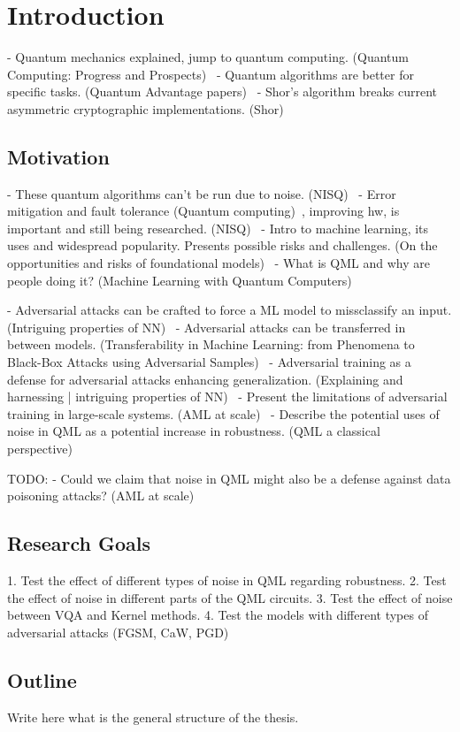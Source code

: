 \chapter{Introduction}\label{chapter:introduction}

- Quantum mechanics explained, jump to quantum computing. (Quantum Computing: Progress and Prospects)~\cite{national_academies_of_sciences_engineering_and_medicine_quantum_2019}
- Quantum algorithms are better for specific tasks. (Quantum Advantage papers)~\cite{shor_polynomial-time_1997, van_dam_quantum_2006, hallgren_polynomial-time_2007}
- Shor's algorithm breaks current asymmetric cryptographic implementations. (Shor)~\cite{shor_polynomial-time_1997}

\section{Motivation}
- These quantum algorithms can't be run due to noise. (NISQ)~\cite{preskill_quantum_2018}
- Error mitigation and fault tolerance (Quantum computing)~\cite{shor_quantum_nodate}, improving hw, is important and still being researched. (NISQ)~\cite{preskill_quantum_2018}
- Intro to machine learning, its uses and widespread popularity. Presents possible risks and challenges. (On the opportunities and risks of foundational models)~\cite{bommasani_opportunities_2022}
- What is QML and why are people doing it? (Machine Learning with Quantum Computers)~\cite{schuld_machine_2021}

- Adversarial attacks can be crafted to force a ML model to missclassify an input. (Intriguing properties of NN)~\cite{szegedy_intriguing_2014}
- Adversarial attacks can be transferred in between models. (Transferability in Machine Learning: from Phenomena to Black-Box Attacks using Adversarial Samples)~\cite{papernot_transferability_2016}
- Adversarial training as a defense for adversarial attacks enhancing generalization. (Explaining and harnessing | intriguing properties of NN)~\cite{goodfellow_explaining_2015, szegedy_intriguing_2014}
- Present the limitations of adversarial training in large-scale systems. (AML at scale)~\cite{kurakin_adversarial_2017}
- Describe the potential uses of noise in QML as a potential increase in robustness. (QML a classical perspective)~\cite{ciliberto_quantum_2018}

TODO\@:
- Could we claim that noise in QML might also be a defense against data poisoning attacks? (AML at scale)~\cite{kurakin_adversarial_2017}

\section{Research Goals}
1. Test the effect of different types of noise in QML regarding robustness.
2. Test the effect of noise in different parts of the QML circuits.
3. Test the effect of noise between VQA and Kernel methods.
4. Test the models with different types of adversarial attacks (FGSM, CaW, PGD)

\section{Outline}
Write here what is the general structure of the thesis.